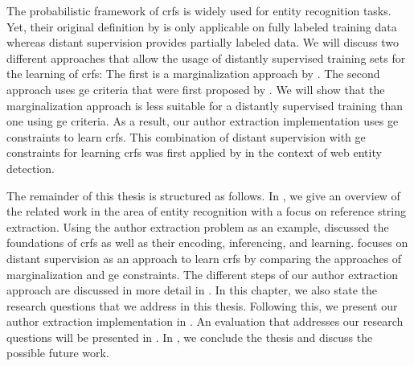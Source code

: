 The probabilistic framework of \glspl{crf} is widely used for entity recognition tasks.
Yet, their original definition by \citet{lafferty2001conditional} is only applicable on fully labeled training data whereas distant supervision provides partially labeled data.
We will discuss two different approaches that allow the usage of distantly supervised training sets for the learning of \glspl{crf}:
The first is a marginalization approach by \citet{tsuboi2008training}.
The second approach uses \gls{ge} criteria that were first proposed by \citet{mann2007simple}.
We will show that the marginalization approach is less suitable for a distantly supervised training than one using \gls{ge} criteria.
As a result, our author extraction implementation uses \gls{ge} constraints to learn \glspl{crf}.
This combination of distant supervision with \gls{ge} constraints for learning \glspl{crf} was first applied by \citet{lu2013web} in the context of web entity detection.

\bigskip

The remainder of this thesis is structured as follows.
In , we give an overview of the related work in the area of entity recognition with a focus on reference string extraction.
Using the author extraction problem as an example,  discussed the foundations of \glspl{crf} as well as their encoding, inferencing, and learning.
 focuses on distant supervision as an approach to learn \glspl{crf} by comparing the approaches of marginalization and \gls{ge} constraints.
The different steps of our author extraction approach are discussed in more detail in .
In this chapter, we also state the research questions that we address in this thesis.
Following this, we present our author extraction implementation in .
An evaluation that addresses our research questions will be presented in .
In , we conclude the thesis and discuss the possible future work.

